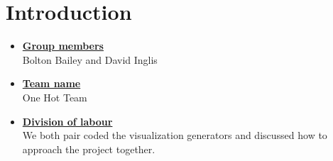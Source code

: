\newif\ifshowsolutions
\showsolutionstrue

\newcommand{\boldline}[1]{\underline{\textbf{#1}}}



\pagestyle{fancy}






\section{Introduction}
\medskip
\begin{itemize}

    \item \boldline{Group members} \\
    Bolton Bailey and David Inglis

    \item \boldline{Team name} \\
    One Hot Team

    \item \boldline{Division of labour} \\
    We both pair coded the  visualization generators and discussed how to approach the project together.

\end{itemize}




